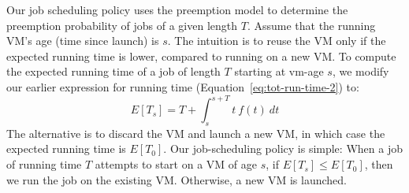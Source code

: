 Our job scheduling policy uses the preemption model to determine the preemption probability of jobs of a given length $T$. 
Assume that the running VM's age (time since launch) is $s$.
The intuition is to reuse the VM only if the expected running time is lower, compared to running on a new VM. 
To compute the expected running time of a job of length $T$ starting at vm-age $s$, we  modify our earlier expression for running time (Equation~\ref{eq:tot-run-time-2}) to: %
\begin{equation}
  \label{eq:tot-run-time-s}
    E[T_s]  = T + \int_{s}^{s+T} t~f(t)~dt
  \end{equation}
The alternative is to discard the VM and launch a new VM, in which case the expected running time is $E[T_0]$. Our job-scheduling policy is simple: 
When a job of running time $T$ attempts to start on a VM of age $s$, if $E[T_s] \leq E[T_0]$, then we run the job on the existing VM.
Otherwise, a new VM is launched.

